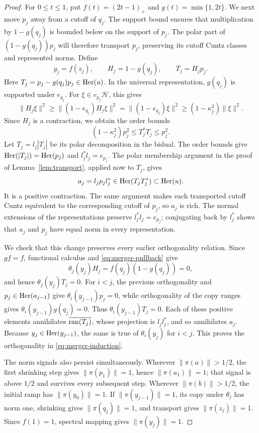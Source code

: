 \begin{proof}
For \(0\le t\le1\), put \(f(t)=(2t-1)_+\) and
\(g(t)=\min\{1,2t\}\).  We next move \(p_j\) away from a cutoff
of \(q_j\).  The support
bound ensures that multiplication by \(1-g(q_j)\) is bounded below
on the support of \(p_j\).  The polar part of
\((1-g(q_j))p_j\) will therefore transport \(p_j\), preserving its
cutoff Cuntz classes and represented norms.
Define
\[
 y_j=f(z_j),\qquad H_j=1-g(q_j),\qquad T_j=H_jp_j.
\]
Here \(T_j=p_j-g(q_j)p_j\in\operatorname{Her}(u)\).  In the universal
representation, \(g(q_j)\) is supported under \(e_{q_j}\).
For \(\xi\in e_{p_j}\mathcal H\), this gives
\[
 \|H_j\xi\|^2
 \ge\|(1-e_{q_j})H_j\xi\|^2
 =\|(1-e_{q_j})\xi\|^2
 \ge(1-\kappa_j^2)\|\xi\|^2.
\]
Since \(H_j\) is a contraction, we obtain the order bounds
\begin{equation}\label{eq:merger-polar-order}
 (1-\kappa_j^2)p_j^2\le T_j^*T_j\le p_j^2.
\end{equation}
Let \(T_j=l_j|T_j|\) be its polar decomposition in the bidual.
The order bounds give \(\operatorname{Her}(|T_j|)=\operatorname{Her}(p_j)\) and
\(l_j^*l_j=e_{p_j}\).  The polar membership argument in the proof
of Lemma~\ref{lem:transport}, applied now to \(T_j\), gives
\[
 a_j=l_jp_jl_j^*\in\operatorname{Her}(T_jT_j^*)\subset\operatorname{Her}(u).
\]
It is a positive contraction.  The same argument makes each
transported cutoff Cuntz equivalent to the corresponding cutoff of
\(p_j\), so \(a_j\) is rich.  The normal extensions of the
representations preserve \(l_j^*l_j=e_{p_j}\); conjugating back by
\(l_j^*\) shows that \(a_j\) and \(p_j\) have equal norm in every
representation.

We check that this change preserves every earlier orthogonality
relation.  Since \(gf=f\), functional calculus and
\eqref{eq:merger-pullback} give
\[
 \theta_j(y_j)H_j=f(q_j)(1-g(q_j))=0,
\]
and hence \(\theta_j(y_j)T_j=0\).  For \(i<j\), the previous
orthogonality and \(p_j\in\operatorname{Her}(a_{j-1})\) give
\(\theta_i(y_{j-1})p_j=0\), while orthogonality of the copy ranges
gives \(\theta_i(y_{j-1})g(q_j)=0\).  Thus
\(\theta_i(y_{j-1})T_j=0\).  Each of these positive elements
annihilates \(\overline{\operatorname{ran}(T_j)}\), whose projection is
\(l_jl_j^*\), and so annihilates \(a_j\).  Because
\(y_j\in\operatorname{Her}(y_{j-1})\), the same is true of \(\theta_i(y_j)\)
for \(i<j\).  This proves the orthogonality in
\eqref{eq:merger-induction}.

The norm signals also persist simultaneously.  Wherever
\(\|\pi(a)\|>1/2\), the first shrinking step gives
\(\|\pi(p_1)\|=1\), hence \(\|\pi(a_1)\|=1\); that signal is
above \(1/2\) and survives every subsequent step.  Wherever
\(\|\pi(b)\|>1/2\), the initial ramp has \(\|\pi(y_0)\|=1\).
If \(\|\pi(y_{j-1})\|=1\), its copy under \(\theta_j\) has norm
one, shrinking gives \(\|\pi(q_j)\|=1\), and transport gives
\(\|\pi(z_j)\|=1\).  Since \(f(1)=1\), spectral mapping gives
\(\|\pi(y_j)\|=1\).


\end{proof}
